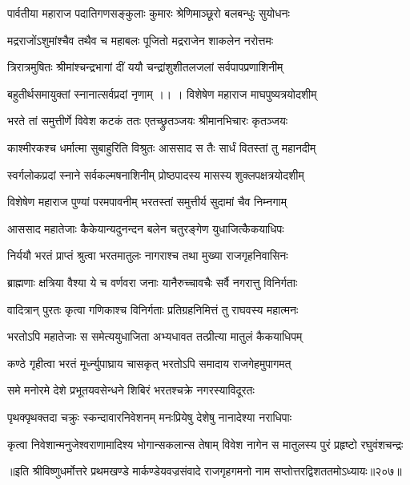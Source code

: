 \twolineshloka
{पार्वतीया महाराज पदातिगणसङ्कुलाः}
{कुमारः श्रेणिमाञ्छूरो बलबन्धुः सुयोधनः}%

\twolineshloka
{मद्रराजोंऽशुमांश्चैव तथैव च महाबलः}
{पूजितो मद्रराजेन शाकलेन नरोत्तमः}%

\twolineshloka
{त्रिरात्रमुषितः श्रीमांश्चन्द्रभागां दीं ययौ}
{चन्द्रांशुशीतलजलां सर्वपापप्रणाशिनीम्} %

\twolineshloka
{बहुतीर्थसमायुक्तां स्नानात्सर्वप्रदां नृणाम् ।। ।}
{विशेषेण महाराज माघपुष्यत्रयोदशीम्}%

\twolineshloka
{भरते तां समुत्तीर्णे विवेश कटकं ततः}
{एतच्छ्रुतञ्जयः श्रीमानभिचारः कृतञ्जयः}%

\twolineshloka
{काश्मीरकश्च धर्मात्मा सुबाहुरिति विश्रुतः}
{आससाद स तैः सार्धं वितस्तां तु महानदीम्}%

\twolineshloka
{स्वर्गलोकप्रदां स्नाने सर्वकल्मषनाशिनीम्}
{प्रोष्ठपादस्य मासस्य शुक्लपक्षत्रयोदशीम्}%

\twolineshloka
{विशेषेण महाराज पुण्यां परमपावनीम्}
{भरतस्तां समुत्तीर्य सुदामां चैव निम्नगाम्}%

\twolineshloka
{आससाद महातेजाः कैकेयान्यदुनन्दन}
{बलेन चतुरङ्गेण युधाजित्कैकयाधिपः}%

\twolineshloka
{निर्ययौ भरतं प्राप्तं श्रुत्वा भरतमातुलः}
{नागराश्च तथा मुख्या राजगृहनिवासिनः}%

\twolineshloka
{ब्राह्मणाः क्षत्रिया वैश्या ये च वर्णवरा जनाः}
{यानैरुच्चावचैः सर्वै नगरात्तु विनिर्गताः}%

\twolineshloka
{वादित्रान् पुरतः कृत्वा गणिकाश्च विनिर्गताः}
{प्रतिग्रहनिमित्तं तु राघवस्य महात्मनः}%

\twolineshloka
{भरतोऽपि महातेजाः स समेत्ययुधाजिता}
{अभ्यधावत तत्प्रीत्या मातुलं कैकयाधिपम्} %

\twolineshloka
{कण्ठे गृहीत्वा भरतं मूर्ध्न्युपाघ्राय चासकृत्}
{भरतोऽपि समादाय राजगेहमुपागमत्}%

\twolineshloka
{समे मनोरमे देशे प्रभूतयवसेन्धने}
{शिबिरं भरतश्चक्रे नगरस्याविदूरतः}%

\twolineshloka
{पृथक्पृथक्तदा चक्रुः स्कन्दावारनिवेशनम्}
{मनःप्रियेषु देशेषु नानादेश्या नराधिपाः}%

\twolineshloka
{कृत्वा निवेशान्मनुजेश्वराणामादिश्य भोगान्सकलान्स तेषाम्}
{विवेश नागेन स मातुलस्य पुरं प्रहृष्टो रघुवंशचन्द्रः}%

॥इति श्रीविष्णुधर्मोत्तरे प्रथमखण्डे मार्कण्डेयवज्रसंवादे राजगृहगमनो नाम सप्तोत्तरद्विशततमोऽध्यायः॥२०७॥

